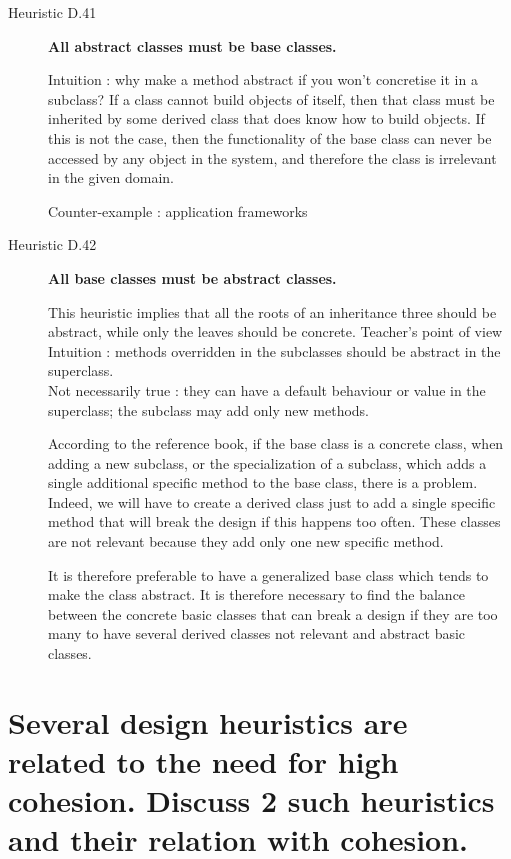 \begin{description}
\item[Heuristic D.41] \textbf{All abstract classes must be base classes.}

Intuition : why make a method abstract if you won’t concretise it in a subclass?
If a class cannot build objects of itself, then that class must be inherited by some derived class that does know how to build objects. If this is not the case, then the functionality of the base class can never be accessed by any object in the system, and therefore the class is irrelevant in the given domain.

Counter-example : application frameworks

\item[Heuristic D.42] \textbf{All base classes must be abstract classes.}

This heuristic implies that all the roots of an inheritance three should be abstract, while only the leaves should be concrete.
Teacher's point of view \\
Intuition : methods overridden in the subclasses should be abstract in the superclass. \\
Not necessarily true :
they can have a default behaviour or value in the superclass; the subclass may add only new methods.


According to the reference book, if the base class is a concrete class, when adding a new subclass, or the specialization of a subclass, which adds a single additional specific method to the base class, there is a problem. Indeed, we will have to create a derived class just to add a single specific method that will break the design if this happens too often. These classes are not relevant because they add only one new specific method.

It is therefore preferable to have a generalized base class which tends to make the class abstract. It is therefore necessary to find the balance between the concrete basic classes that can break a design if they are too many to have several derived classes not relevant and abstract basic classes.

\end{description}



\section{Several design heuristics are related to the need for high cohesion. Discuss 2 such
heuristics and their relation with cohesion.}

